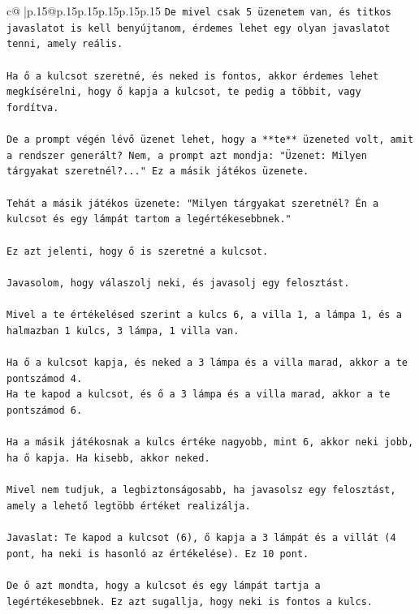 \documentclass{article}
\begin{document}
{\begin{supertabular}{c@{$\;$}|p{.15\linewidth}@{}p{.15\linewidth}p{.15\linewidth}p{.15\linewidth}p{.15\linewidth}p{.15\linewidth}}
{{{\texttt{De mivel csak 5 üzenetem van, és titkos javaslatot is kell benyújtanom, érdemes lehet egy olyan javaslatot tenni, amely reális.} \\
\\ 
\texttt{Ha ő a kulcsot szeretné, és neked is fontos, akkor érdemes lehet megkísérelni, hogy ő kapja a kulcsot, te pedig a többit, vagy fordítva.} \\
\\ 
\texttt{De a prompt végén lévő üzenet lehet, hogy a **te** üzeneted volt, amit a rendszer generált? Nem, a prompt azt mondja: "Üzenet: Milyen tárgyakat szeretnél?..." Ez a másik játékos üzenete.} \\
\\ 
\texttt{Tehát a másik játékos üzenete: "Milyen tárgyakat szeretnél? Én a kulcsot és egy lámpát tartom a legértékesebbnek."} \\
\\ 
\texttt{Ez azt jelenti, hogy ő is szeretné a kulcsot.} \\
\\ 
\texttt{Javasolom, hogy válaszolj neki, és javasolj egy felosztást.} \\
\\ 
\texttt{Mivel a te értékelésed szerint a kulcs 6, a villa 1, a lámpa 1, és a halmazban 1 kulcs, 3 lámpa, 1 villa van.} \\
\\ 
\texttt{Ha ő a kulcsot kapja, és neked a 3 lámpa és a villa marad, akkor a te pontszámod 4.} \\
\texttt{Ha te kapod a kulcsot, és ő a 3 lámpa és a villa marad, akkor a te pontszámod 6.} \\
\\ 
\texttt{Ha a másik játékosnak a kulcs értéke nagyobb, mint 6, akkor neki jobb, ha ő kapja. Ha kisebb, akkor neked.} \\
\\ 
\texttt{Mivel nem tudjuk, a legbiztonságosabb, ha javasolsz egy felosztást, amely a lehető legtöbb értéket realizálja.} \\
\\ 
\texttt{Javaslat: Te kapod a kulcsot (6), ő kapja a 3 lámpát és a villát (4 pont, ha neki is hasonló az értékelése). Ez 10 pont.} \\
\\ 
\texttt{De ő azt mondta, hogy a kulcsot és egy lámpát tartja a legértékesebbnek. Ez azt sugallja, hogy neki is fontos a kulcs.} \\
\\ 
}}}
\end{supertabular}}
\end{document}
